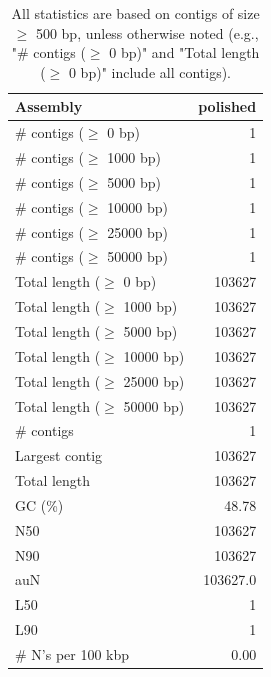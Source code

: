 \documentclass[12pt,a4paper]{article}
\begin{document}
\begin{table}[ht]
\begin{center}
\caption{All statistics are based on contigs of size $\geq$ 500 bp, unless otherwise noted (e.g., "\# contigs ($\geq$ 0 bp)" and "Total length ($\geq$ 0 bp)" include all contigs).}
\begin{tabular}{|l*{1}{|r}|}
\hline
Assembly & polished \\ \hline
\# contigs ($\geq$ 0 bp) & 1 \\ \hline
\# contigs ($\geq$ 1000 bp) & 1 \\ \hline
\# contigs ($\geq$ 5000 bp) & 1 \\ \hline
\# contigs ($\geq$ 10000 bp) & 1 \\ \hline
\# contigs ($\geq$ 25000 bp) & 1 \\ \hline
\# contigs ($\geq$ 50000 bp) & 1 \\ \hline
Total length ($\geq$ 0 bp) & 103627 \\ \hline
Total length ($\geq$ 1000 bp) & 103627 \\ \hline
Total length ($\geq$ 5000 bp) & 103627 \\ \hline
Total length ($\geq$ 10000 bp) & 103627 \\ \hline
Total length ($\geq$ 25000 bp) & 103627 \\ \hline
Total length ($\geq$ 50000 bp) & 103627 \\ \hline
\# contigs & 1 \\ \hline
Largest contig & 103627 \\ \hline
Total length & 103627 \\ \hline
GC (\%) & 48.78 \\ \hline
N50 & 103627 \\ \hline
N90 & 103627 \\ \hline
auN & 103627.0 \\ \hline
L50 & 1 \\ \hline
L90 & 1 \\ \hline
\# N's per 100 kbp & 0.00 \\ \hline
\end{tabular}
\end{center}
\end{table}
\end{document}
